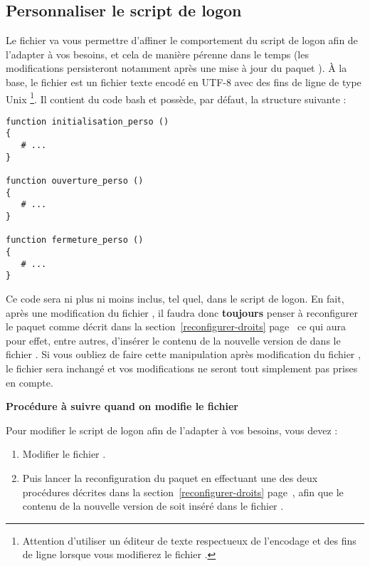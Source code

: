 \subsection{Personnaliser le script de logon}
\label{personnalisation}

Le fichier  va vous permettre
d'affiner le comportement du script de logon afin de l'adapter
à vos besoins, et cela de manière pérenne dans le temps
(les modifications persisteront notamment après une mise
à jour du paquet ). À la
base, le fichier  est un fichier
texte encodé en UTF-8 avec des fins de ligne de type
Unix%
%
\footnote{Attention d'utiliser un éditeur de texte respectueux de l'encodage
et des fins de ligne lorsque vous modifierez le fichier .}.
%
Il contient du code bash et possède, par défaut, la structure suivante :
%
\begin{lstlisting}
function initialisation_perso ()
{
   # ...
}

function ouverture_perso ()
{
   # ...
}

function fermeture_perso ()
{
   # ...
}
\end{lstlisting}
%
Ce code sera ni plus ni moins inclus, tel quel, dans le script de logon.
En fait, après une modification du fichier , il
faudra donc \textbf{toujours} penser à reconfigurer le paquet
 comme décrit dans la section~\ref{reconfigurer-droits}
page~\pageref{reconfigurer-droits} ce qui aura pour effet, entre autres,
d'insérer le contenu de la nouvelle version de 
dans le fichier . Si vous oubliez de faire cette manipulation
après modification du fichier , le fichier 
sera inchangé et vos modifications ne seront tout simplement pas prises en compte.

\begin{alerte}
\begin{center}
\textbf{Procédure à suivre quand on modifie le fichier }
\end{center}

Pour modifier le script de logon afin de l'adapter à vos besoins,
vous devez :
\begin{enumerate}
\item Modifier le fichier .
\item Puis lancer la reconfiguration du paquet  en effectuant
une des deux procédures décrites dans la section~\ref{reconfigurer-droits}
page~\pageref{reconfigurer-droits}, afin que le contenu de la nouvelle version de
 soit inséré dans le fichier .
\end{enumerate}
\end{alerte}


